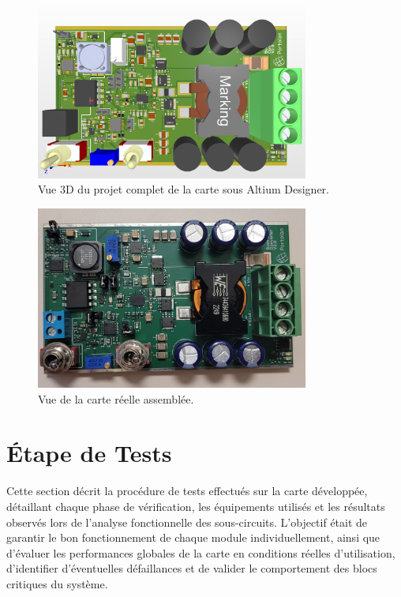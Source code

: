 \begin{figure}[H]
    \centering
    \includegraphics[width=0.8\textwidth]{figures/PCB_3D.png}
    \caption{Vue 3D du projet complet de la carte sous Altium Designer.}
    \label{fig:pcb_3d}
\end{figure}

\begin{figure}[H]
    \centering
    \includegraphics[width=0.8\textwidth]{figures/PCB_Real.jpg}
    \caption{Vue de la carte réelle assemblée.}
    \label{fig:pcb_real}
\end{figure}




\section{Étape de Tests}

Cette section décrit la procédure de tests effectués sur la carte développée, détaillant chaque phase de vérification, les équipements utilisés et les résultats observés lors de l'analyse fonctionnelle des sous-circuits. L'objectif était de garantir le bon fonctionnement de chaque module individuellement, ainsi que d'évaluer les performances globales de la carte en conditions réelles d'utilisation, d'identifier d'éventuelles défaillances et de valider le comportement des blocs critiques du système.

